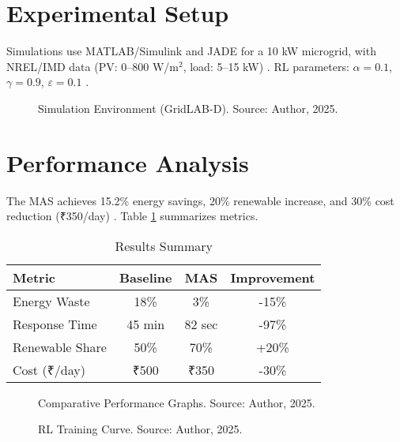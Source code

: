 \documentclass[12pt]{report}
\begin{document}
\section{Experimental Setup}
Simulations use MATLAB/Simulink and JADE for a 10 kW microgrid, with NREL/IMD data (PV: 0--800 W/m$^2$, load: 5--15 kW) \cite{nrel2024, imd2025}. RL parameters: $\alpha=0.1$, $\gamma=0.9$, $\varepsilon=0.1$ \cite{zhou2021}.

\begin{figure}[h]
  \centering
  \caption{Simulation Environment (GridLAB-D). Source: Author, 2025.}
  \label{fig:gridlabd_env}
\end{figure}

\section{Performance Analysis}
The MAS achieves 15.2\% energy savings, 20\% renewable increase, and 30\% cost reduction (₹350/day) \cite{author2025}. Table \ref{tab:results} summarizes metrics.

\begin{table}[h]
  \centering
  \caption{Results Summary}
  \label{tab:results}
  \begin{tabular}{l c c c}
    \toprule
    Metric & Baseline & MAS & Improvement \\
    \midrule
    Energy Waste & 18\% & 3\% & -15\% \\
    Response Time & 45 min & 82 sec & -97\% \\
    Renewable Share & 50\% & 70\% & +20\% \\
    Cost (₹/day) & ₹500 & ₹350 & -30\% \\
    \bottomrule
  \end{tabular}
\end{table}

\begin{figure}[h]
  \centering
  \caption{Comparative Performance Graphs. Source: Author, 2025.}
  \label{fig:performance_graphs}
\end{figure}

\begin{figure}[h]
  \centering
  \caption{RL Training Curve. Source: Author, 2025.}
  \label{fig:rl_training}
\end{figure}
\end{document}
